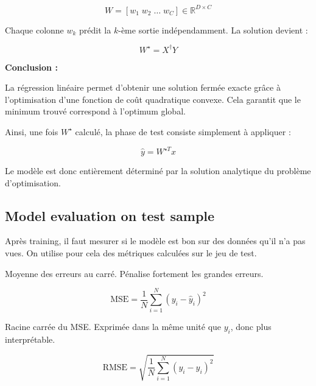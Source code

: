 \documentclass[11pt,a4paper,openany]{book}
\begin{document}
\[
W = [w_1 \; w_2 \; \dots \; w_C] \in \mathbb{R}^{D \times C}
\]

Chaque colonne $w_k$ prédit la $k$-ème sortie indépendamment. La solution devient :

\[
W^\star = X^\dagger Y
\]

\vspace{0.8cm}

\textbf{Conclusion :}

La régression linéaire permet d'obtenir une solution fermée exacte grâce à l'optimisation d'une fonction de coût quadratique convexe. Cela garantit que le minimum trouvé correspond à l'optimum global.

Ainsi, une fois $W^\star$ calculé, la phase de test consiste simplement à appliquer :

\[
\hat{y} = W^{\star T} x
\]

\vspace{0.4cm}

Le modèle est donc entièrement déterminé par la solution analytique du problème d'optimisation.

\vspace{8cm}

\subsection{Model evaluation on test sample}

Après training, il faut mesurer si le modèle est bon sur des données qu'il n'a pas vues.
On utilise pour cela des métriques calculées sur le jeu de test.

\vspace{0.6cm}

\begin{defnbox}[title=Mean Squared Error (MSE)]
Moyenne des erreurs au carré. Pénalise fortement les grandes erreurs.

\[
\mathrm{MSE} = \frac{1}{N} \sum_{i=1}^{N} (y_i - \hat{y}_i)^2
\]
\end{defnbox}

\vspace{0.4cm}

\begin{defnbox}[title=Root Mean Squared Error (RMSE)]
Racine carrée du MSE. Exprimée dans la même unité que $y_i$, donc plus interprétable.

\[
\mathrm{RMSE} = \sqrt{\frac{1}{N} \sum_{i=1}^{N} (y_i - \hat{y}_i)^2}
\]
\end{defnbox}
\end{document}
